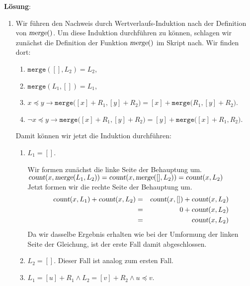 \documentclass{article}
\renewcommand{\labelenumi}{(\alph{enumi})}
\renewcommand{\labelenumii}{\arabic{enumii}.}
\begin{document}
\noindent
\textbf{L\"osung}:
\begin{enumerate}
\item Wir f\"uhren den Nachweis durch Wertverlaufs-Induktion nach der Definition von $\textsl{merge}()$.
      Um diese Induktion durchf\"uhren zu k\"onnen, schlagen wir zun\"achst die Definition der Funktion 
      $\textsl{merge}()$ im Skript nach.  Wir finden dort:
      \begin{enumerate}
        \renewcommand{\labelenumi}{\arabic{enumi}.}
      \item $\mathtt{merge}([], L_2) = L_2$,
      \item $\mathtt{merge}(L_1, []) = L_1$,
      \item $x \preceq y \rightarrow 
             \mathtt{merge}\bigl([x]+R_1, [y]+R_2\bigr) = [x] + \mathtt{merge}\bigl(R_1,[y]+R_2\bigr)$.
           \item $\neg x \preceq y \rightarrow 
                  \mathtt{merge}\bigl([x]+R_1, [y]+R_2\bigr) = [y] + \mathtt{merge}\bigl([x] + R_1,R_2\bigr)$.
      \end{enumerate}
      Damit k\"onnen wir jetzt die Induktion durchf\"uhren:
      \begin{enumerate}
        \renewcommand{\labelenumii}{\arabic{enumii}.}
      \item $L_1 = []$.  

            Wir formen zun\"achst die linke Seite der Behauptung um.
            \\[0.2cm]
            \hspace*{1.3cm}
            $\textsl{count}(x, \textsl{merge}(L_1, L_2)) = \textsl{count}(x, \textsl{merge}([], L_2))
             = \textsl{count}(x, L_2)$
            \\[0.2cm]
            Jetzt formen wir die rechte Seite der Behauptung um.
            \begin{eqnarray*}
                  \textsl{count}(x, L_1) + \textsl{count}(x, L_2) 
            & = & \textsl{count}(x, []) + \textsl{count}(x, L_2)   \\
            & = & 0 + \textsl{count}(x, L_2)                       \\
            & = & \textsl{count}(x, L_2)
            \end{eqnarray*}
            Da wir dasselbe Ergebnis erhalten wie bei der Umformung der linken Seite der Gleichung,
            ist der erste Fall damit abgeschlossen.
      \item $L_2 = []$.  Dieser Fall ist analog zum ersten Fall.
      \item $L_1 = [u] + R_1 \wedge L_2 = [v] + R_2 \wedge u \preceq v$.


\end{enumerate}
\end{enumerate}
\end{document}
